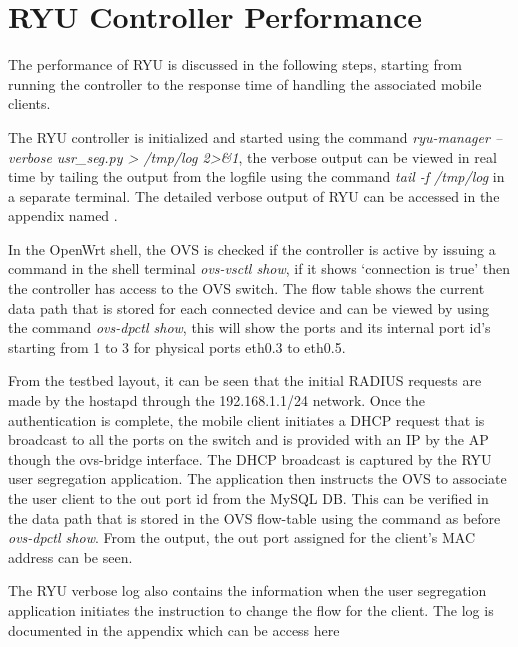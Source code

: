 \section{RYU Controller Performance}
The performance of RYU is discussed in the following steps, starting from running the controller to the response time of handling the associated mobile clients.

The RYU controller is initialized and started using the command \textit{ryu-manager --verbose usr\_seg.py > /tmp/log 2>\&1}, the verbose output can be viewed in real time by tailing the output from the logfile using the command \textit{tail -f /tmp/log} in a separate terminal. The detailed verbose output of RYU can be accessed in the appendix named .
 
In the OpenWrt shell, the OVS is checked if the controller is active by issuing a command in the shell terminal \textit{ovs-vsctl show}, if it shows ‘connection is true’ then the controller has access to the OVS switch. The flow table shows the current data path that is stored for each connected device and can be viewed by using the command \textit{ovs-dpctl show}, this will show the ports and its internal port id’s starting from 1 to 3 for physical ports eth0.3 to eth0.5.

From the testbed layout, it can be seen that the initial RADIUS requests are made by the hostapd through the 192.168.1.1/24 network. Once the authentication is complete, the mobile client initiates a DHCP request that is broadcast to all the ports on the switch and is provided with an IP by the AP though the ovs-bridge interface. The DHCP broadcast is captured by the RYU user segregation application. The application then instructs the OVS to associate the user client to the out port id from the MySQL DB. This can be verified in the data path that is stored in the OVS flow-table using the command as before \textit{ovs-dpctl show}. From the output, the out port assigned for the client's MAC address can be seen.

The RYU verbose log also contains the information when the user segregation application initiates the instruction to change the flow for the client. The log is documented in the appendix which can be access here 


